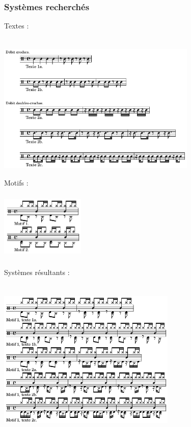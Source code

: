 \subsubsection{Systèmes recherchés}
Textes :\\\\
\includegraphics[height=70mm, width=95mm]{z_images/1_description_notation/systemes/0_textes_4-4_binaires.png}\\
Motifs :\\\\
\includegraphics[height=30mm, width=40mm]{z_images/1_description_notation/systemes/1_motifs_4-4_binaires.png}\\\\
Systèmes résultants :\\\\
\includegraphics[height=75mm, width=85mm]{z_images/4_experimentations/experience_1/systeme_recherche_1.png}
